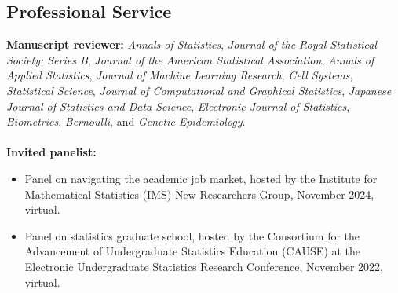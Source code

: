 \documentclass[margin, 10pt]{res}
\begin{document}
\begin{resume}
\section{Professional Service}
\textbf{Manuscript reviewer:} \textit{Annals of Statistics}, \textit{Journal of the Royal Statistical Society: Series B}, \textit{Journal of the American Statistical Association}, \textit{Annals of Applied Statistics}, \textit{Journal of Machine Learning Research}, \textit{Cell Systems}, \textit{Statistical Science}, \textit{Journal of Computational and Graphical Statistics}, \textit{Japanese Journal of Statistics and Data Science}, \textit{Electronic Journal of Statistics}, \textit{Biometrics}, \textit{Bernoulli}, and \textit{Genetic Epidemiology}. \\
\\
\textbf{Invited panelist:}
\begin{itemize}
\item Panel on navigating the academic job market, hosted by the Institute for Mathematical Statistics (IMS) New Researchers Group, November 2024, virtual. 
\item Panel on statistics graduate school, hosted by the Consortium for the Advancement of Undergraduate Statistics Education (CAUSE) at the  Electronic Undergraduate Statistics Research Conference, November 2022, virtual.
\end{itemize}




\end{resume}
\end{document}
